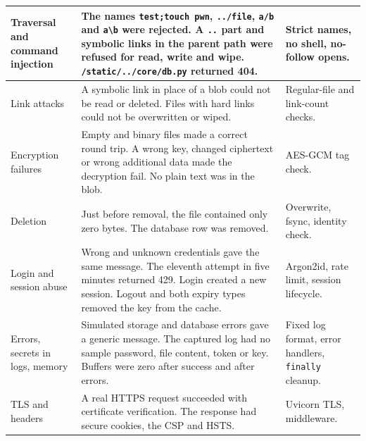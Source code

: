 \begin{longtable}[hp]{|p{2.7cm}|p{7.5cm}|p{3.0cm}|}
	Traversal and command injection & The names \texttt{test;touch pwn}, \texttt{../file}, \texttt{a/b} and \texttt{a\textbackslash b} were rejected. A \texttt{..} part and symbolic links in the parent path were refused for read, write and wipe. \texttt{/static/../core/db.py} returned 404. & Strict names, no shell, no-follow opens. \\ \hline
	Link attacks & A symbolic link in place of a blob could not be read or deleted. Files with hard links could not be overwritten or wiped. & Regular-file and link-count checks. \\ \hline
	Encryption failures & Empty and binary files made a correct round trip. A wrong key, changed ciphertext or wrong additional data made the decryption fail. No plain text was in the blob. & AES-GCM tag check. \\ \hline
	Deletion & Just before removal, the file contained only zero bytes. The database row was removed. & Overwrite, fsync, identity check. \\ \hline
	Login and session abuse & Wrong and unknown credentials gave the same message. The eleventh attempt in five minutes returned 429. Login created a new session. Logout and both expiry types removed the key from the cache. & Argon2id, rate limit, session lifecycle. \\ \hline
	Errors, secrets in logs, memory & Simulated storage and database errors gave a generic message. The captured log had no sample password, file content, token or key. Buffers were zero after success and after errors. & Fixed log format, error handlers, \texttt{finally} cleanup. \\ \hline
	TLS and headers & A real HTTPS request succeeded with certificate verification. The response had secure cookies, the CSP and HSTS. & Uvicorn TLS, middleware. \\ \hline
\end{longtable}